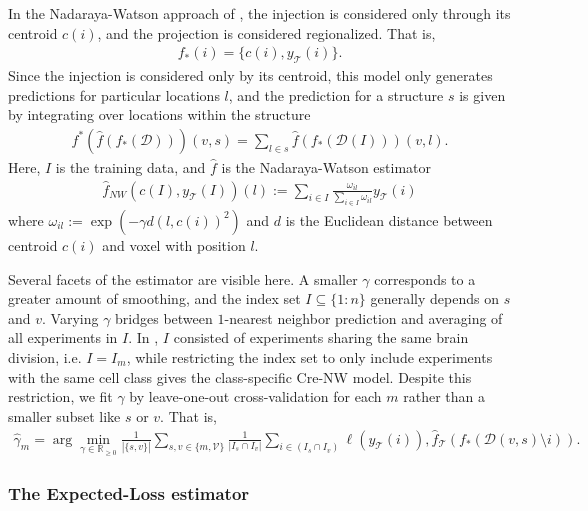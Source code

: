 In the Nadaraya-Watson approach of \citet{Knox2019-ot}, the injection is considered only through its centroid $c(i)$, and the projection is considered regionalized.
That is,
\begin{eqnarray*}
f_*(i) = \{c(i), y_{\mathcal T}(i)\}.
\end{eqnarray*}
Since the injection is considered only by its centroid, this model only generates predictions for particular locations $l$, and the prediction for a structure $s$ is given by integrating over locations within the structure
\begin{eqnarray*}
\label{eq:regionalize}
f^* (\hat f (f_*(\mathcal D))) (v,s) = \sum_{l \in s} \hat f (f_*(\mathcal D(I))) (v,l ).
\end{eqnarray*}
Here, $I$ is the training data, and $\hat f$ is the Nadaraya-Watson estimator
\begin{eqnarray*}
\hat f_{NW}( c(I) , y_{\mathcal T}(I) ) (l) :=  \sum_{i \in I} \frac{ \omega_{i l}}{\sum_{i \in I} \omega_{i l}} y_{\mathcal T}(i)
\end{eqnarray*}
where $\omega_{i l } := \exp( - \gamma d( l , c(i))^2 )$ and $d$ is the Euclidean distance between centroid $c(i)$ and voxel with position $l$.

Several facets of the estimator are visible here. 
A smaller $\gamma$ corresponds to a greater amount of smoothing, and the index set $I \subseteq  \{1:n\}$ generally depends on $s$ and $v$.
Varying $\gamma$   bridges between $1$-nearest neighbor prediction and averaging of all experiments in $I$.
In \citet{Knox2019-ot}, $I$ consisted of experiments sharing the same brain division, i.e. $I = I_m$, while restricting the index set to only include experiments with the same cell class gives the class-specific Cre-NW model.
Despite this restriction, we fit $\gamma$ by leave-one-out cross-validation for each $m$ rather than a smaller subset like $s$ or $v$.
That is,
\begin{eqnarray}
\label{eq:gamma_sel}
\widehat \gamma_m =  \arg \min_{\gamma \in \mathbb R_{\geq 0}} \frac{1}{|\{s,v\}|} \sum_{s,v \in \{m,\mathcal V\}} \frac{1}{ |I_{s} \cap I_v |} \sum_{i \in (I_{s} \cap I_v ) } \ell (y_{\mathcal T}(i)), \hat f_{\mathcal T} (f_*(\mathcal D(v,s) \setminus i)) .
\end{eqnarray}

\newpage
\subsubsection{The Expected-Loss estimator}

